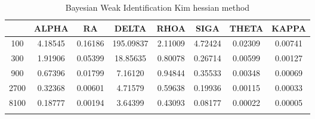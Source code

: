 \documentclass[a4paper,10pt]{article}
\begin{document}
\centering
\begin{longtable}{cccccccc}
\toprule
 & ALPHA & RA & DELTA & RHOA & SIGA & THETA & KAPPA \\
\midrule
100 & 4.18545 & 0.16186 & 195.09837 & 2.11009 & 4.72424 & 0.02309 & 0.00741 \\
300 & 1.91906 & 0.05399 & 18.85635 & 0.80078 & 0.26714 & 0.00599 & 0.00127 \\
900 & 0.67396 & 0.01799 & 7.16120 & 0.94844 & 0.35533 & 0.00348 & 0.00069 \\
2700 & 0.32368 & 0.00601 & 4.71579 & 0.59638 & 0.19936 & 0.00115 & 0.00033 \\
8100 & 0.18777 & 0.00194 & 3.64399 & 0.43093 & 0.08177 & 0.00022 & 0.00005 \\
\bottomrule
\caption{Bayesian Weak Identification Kim hessian method}
\label{table:tbl:WeakKim_hessian}
\end{longtable}
\end{document}
